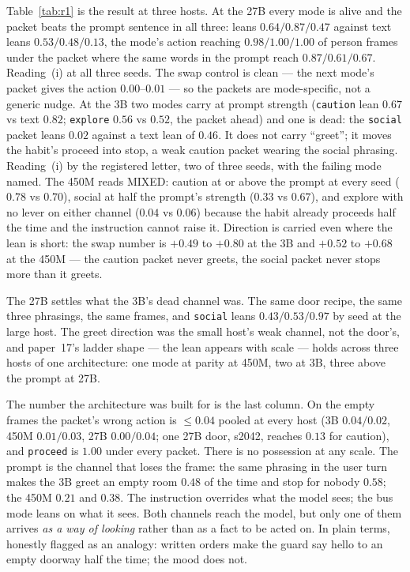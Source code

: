 \documentclass[11pt]{article}
\begin{document}
Table~\ref{tab:r1} is the result at three hosts. At the 27B every mode is
alive and the packet beats the prompt sentence in all three: leans
$0.64 / 0.87 / 0.47$ against text leans $0.53 / 0.48 / 0.13$, the mode's
action reaching $0.98 / 1.00 / 1.00$ of person frames under the packet
where the same words in the prompt reach $0.87 / 0.61 / 0.67$. Reading~(i)
at all three seeds. The swap control is clean --- the next mode's packet
gives the action $0.00$--$0.01$ --- so the packets are mode-specific, not
a generic nudge. At the 3B two modes carry at prompt strength
(\texttt{caution} lean $0.67$ vs text $0.82$; \texttt{explore} $0.56$ vs
$0.52$, the packet ahead) and one is dead: the \texttt{social} packet
leans $0.02$ against a text lean of $0.46$. It does not carry ``greet'';
it moves the habit's proceed into stop, a weak caution packet wearing the
social phrasing. Reading~(i) by the registered letter, two of three
seeds, with the failing mode named. The 450M reads MIXED: caution at or
above the prompt at every seed ($0.78$ vs $0.70$), social at half the
prompt's strength ($0.33$ vs $0.67$), and explore with no lever on either
channel ($0.04$ vs $0.06$) because the habit already proceeds half the
time and the instruction cannot raise it. Direction is carried even where
the lean is short: the swap number is $+0.49$ to $+0.80$ at the 3B and
$+0.52$ to $+0.68$ at the 450M --- the caution packet never greets, the
social packet never stops more than it greets.

The 27B settles what the 3B's dead channel was. The same door recipe,
the same three phrasings, the same frames, and \texttt{social} leans
$0.43 / 0.53 / 0.97$ by seed at the large host. The greet direction was
the small host's weak channel, not the door's, and paper~17's ladder
shape --- the lean appears with scale --- holds across three hosts of one
architecture: one mode at parity at 450M, two at 3B, three above the
prompt at 27B.

The number the architecture was built for is the last column. On the
empty frames the packet's wrong action is $\le 0.04$ pooled at every host
(3B $0.04 / 0.02$, 450M $0.01 / 0.03$, 27B $0.00 / 0.04$; one 27B door,
s2042, reaches $0.13$ for caution), and \texttt{proceed} is $1.00$ under
every packet. There is no possession at any scale. The prompt is the
channel that loses the frame: the same phrasing in the user turn makes
the 3B greet an empty room $0.48$ of the time and stop for nobody
$0.58$; the 450M $0.21$ and $0.38$. The instruction overrides what the
model sees; the bus mode leans on what it sees. Both channels reach the
model, but only one of them arrives \emph{as a way of looking} rather
than as a fact to be acted on. In plain terms, honestly flagged as an
analogy: written orders make the guard say hello to an empty doorway
half the time; the mood does not.
\end{document}

